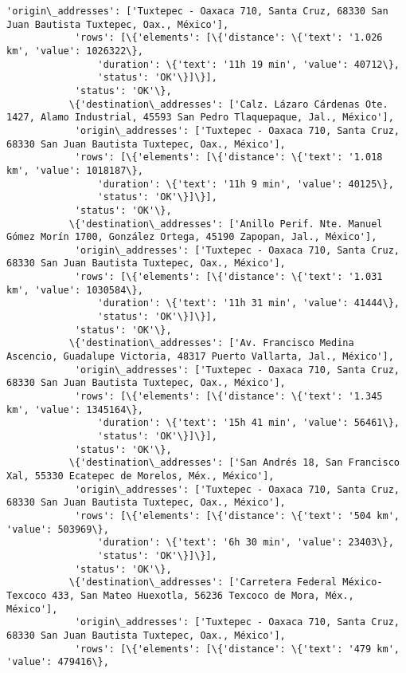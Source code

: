\documentclass[11pt]{article}
\begin{document}
\begin{Verbatim}[commandchars=\\\{\}]
            'origin\_addresses': ['Tuxtepec - Oaxaca 710, Santa Cruz, 68330 San Juan Bautista Tuxtepec, Oax., México'],
            'rows': [\{'elements': [\{'distance': \{'text': '1.026 km', 'value': 1026322\},
                'duration': \{'text': '11h 19 min', 'value': 40712\},
                'status': 'OK'\}]\}],
            'status': 'OK'\},
           \{'destination\_addresses': ['Calz. Lázaro Cárdenas Ote. 1427, Alamo Industrial, 45593 San Pedro Tlaquepaque, Jal., México'],
            'origin\_addresses': ['Tuxtepec - Oaxaca 710, Santa Cruz, 68330 San Juan Bautista Tuxtepec, Oax., México'],
            'rows': [\{'elements': [\{'distance': \{'text': '1.018 km', 'value': 1018187\},
                'duration': \{'text': '11h 9 min', 'value': 40125\},
                'status': 'OK'\}]\}],
            'status': 'OK'\},
           \{'destination\_addresses': ['Anillo Perif. Nte. Manuel Gómez Morín 1700, González Ortega, 45190 Zapopan, Jal., México'],
            'origin\_addresses': ['Tuxtepec - Oaxaca 710, Santa Cruz, 68330 San Juan Bautista Tuxtepec, Oax., México'],
            'rows': [\{'elements': [\{'distance': \{'text': '1.031 km', 'value': 1030584\},
                'duration': \{'text': '11h 31 min', 'value': 41444\},
                'status': 'OK'\}]\}],
            'status': 'OK'\},
           \{'destination\_addresses': ['Av. Francisco Medina Ascencio, Guadalupe Victoria, 48317 Puerto Vallarta, Jal., México'],
            'origin\_addresses': ['Tuxtepec - Oaxaca 710, Santa Cruz, 68330 San Juan Bautista Tuxtepec, Oax., México'],
            'rows': [\{'elements': [\{'distance': \{'text': '1.345 km', 'value': 1345164\},
                'duration': \{'text': '15h 41 min', 'value': 56461\},
                'status': 'OK'\}]\}],
            'status': 'OK'\},
           \{'destination\_addresses': ['San Andrés 18, San Francisco Xal, 55330 Ecatepec de Morelos, Méx., México'],
            'origin\_addresses': ['Tuxtepec - Oaxaca 710, Santa Cruz, 68330 San Juan Bautista Tuxtepec, Oax., México'],
            'rows': [\{'elements': [\{'distance': \{'text': '504 km', 'value': 503969\},
                'duration': \{'text': '6h 30 min', 'value': 23403\},
                'status': 'OK'\}]\}],
            'status': 'OK'\},
           \{'destination\_addresses': ['Carretera Federal México-Texcoco 433, San Mateo Huexotla, 56236 Texcoco de Mora, Méx., México'],
            'origin\_addresses': ['Tuxtepec - Oaxaca 710, Santa Cruz, 68330 San Juan Bautista Tuxtepec, Oax., México'],
            'rows': [\{'elements': [\{'distance': \{'text': '479 km', 'value': 479416\},

\end{Verbatim}
\end{document}
